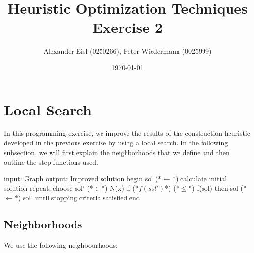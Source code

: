 \documentclass{scrartcl}
\author{Alexander Eisl (0250266), Peter Wiedermann (0025999)}
\date{\today}
\title{Heuristic Optimization Techniques \\ Exercise 2}
\begin{document}
\maketitle


\section{Local Search}
\label{sec:deterministic}
In this programming exercise, we improve the results of the
construction heuristic developed in the previous exercise by using a
local search. In the following subsection, we will first explain the
neighborhoods that we define and then outline the step functions used.

\begin{algorithm}[caption={Local search}]
    input: Graph 
    output: Improved solution
    begin
    	sol (*$\leftarrow$*) calculate initial solution
	repeat:
		choose sol' (*$\in$*) N(x) 
		if (*$f(sol')$*) (*$\leq$*) f(sol) then
			sol (*$\leftarrow$*) sol'
	until stopping criteria satisfied
    end
\end{algorithm}


\subsection{Neighborhoods}
\label{neighborhoods}
We use the following neighbourhoods:
\end{document}
